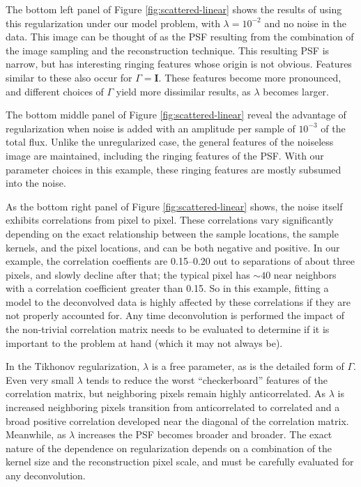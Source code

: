 \documentclass[twocolumn,tighten]{aastex61}
\begin{document}
The bottom left panel of Figure \ref{fig:scattered-linear} shows the
results of using this regularization under our model problem, with
$\lambda=10^{-2}$ and no noise in the data. This image can be thought
of as the PSF resulting from the combination of the image sampling and
the reconstruction technique.  This resulting PSF is narrow, but has
interesting ringing features whose origin is not obvious. Features
similar to these also occur for $\Gamma = \mathbf{I}$.  These features
become more pronounced, and different choices of $\Gamma$ yield more
dissimilar results, as $\lambda$ becomes larger.

The bottom middle panel of Figure \ref{fig:scattered-linear} reveal
the advantage of regularization when noise is added with an amplitude
per sample of $10^{-3}$ of the total flux. Unlike the unregularized
case, the general features of the noiseless image are maintained,
including the ringing features of the PSF. With our parameter choices
in this example, these ringing features are mostly subsumed into the
noise.

As the bottom right panel of Figure \ref{fig:scattered-linear} shows,
the noise itself exhibits correlations from pixel to pixel. These
correlations vary significantly depending on the exact relationship
between the sample locations, the sample kernels, and the pixel
locations, and can be both negative and positive. In our example, the
correlation coeffients are 0.15--0.20 out to separations of about
three pixels, and slowly decline after that; the typical pixel has
$\sim 40$ near neighbors with a correlation coefficient greater than
0.15. So in this example, fitting a model to the deconvolved data is
highly affected by these correlations if they are not properly
accounted for. Any time deconvolution is performed the impact of the
non-trivial correlation matrix needs to be evaluated to determine if
it is important to the problem at hand (which it may not always be).

In the Tikhonov regularization, $\lambda$ is a free parameter, as is
the detailed form of $\Gamma$.  Even very small $\lambda$ tends to
reduce the worst ``checkerboard'' features of the correlation matrix,
but neighboring pixels remain highly anticorrelated.  As $\lambda$ is
increased neighboring pixels transition from anticorrelated to
correlated and a broad positive correlation developed near the
diagonal of the correlation matrix. Meanwhile, as $\lambda$ increases
the PSF becomes broader and broader. The exact nature of the
dependence on regularization depends on a combination of the kernel
size and the reconstruction pixel scale, and must be carefully
evaluated for any deconvolution.
\end{document}
